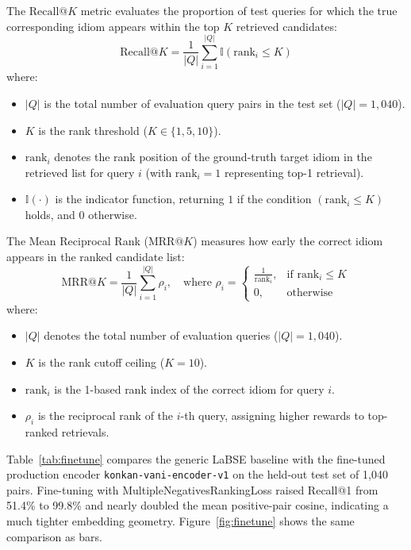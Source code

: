 \documentclass[12pt,a4paper]{article}
\begin{document}
The $\mathrm{Recall@}K$ metric evaluates the proportion of test queries for which the true corresponding idiom appears within the top $K$ retrieved candidates:
\begin{equation}
\label{eq:recall_at_k}
\mathrm{Recall@}K = \frac{1}{|Q|} \sum_{i=1}^{|Q|} \mathbb{I}(\mathrm{rank}_i \le K)
\end{equation}
where:
\begin{itemize}
  \item $|Q|$ is the total number of evaluation query pairs in the test set ($|Q| = 1{,}040$).
  \item $K$ is the rank threshold ($K \in \{1, 5, 10\}$).
  \item $\mathrm{rank}_i$ denotes the rank position of the ground-truth target idiom in the retrieved list for query $i$ (with $\mathrm{rank}_i = 1$ representing top-1 retrieval).
  \item $\mathbb{I}(\cdot)$ is the indicator function, returning $1$ if the condition $(\mathrm{rank}_i \le K)$ holds, and $0$ otherwise.
\end{itemize}

The Mean Reciprocal Rank ($\mathrm{MRR@}K$) measures how early the correct idiom appears in the ranked candidate list:
\begin{equation}
\label{eq:mrr_at_k}
\mathrm{MRR@}K = \frac{1}{|Q|} \sum_{i=1}^{|Q|} \rho_i, \quad \text{where } \rho_i = \begin{cases}
\frac{1}{\mathrm{rank}_i}, & \text{if } \mathrm{rank}_i \le K \\
0, & \text{otherwise}
\end{cases}
\end{equation}
where:
\begin{itemize}
  \item $|Q|$ denotes the total number of evaluation queries ($|Q| = 1{,}040$).
  \item $K$ is the rank cutoff ceiling ($K = 10$).
  \item $\mathrm{rank}_i$ is the 1-based rank index of the correct idiom for query $i$.
  \item $\rho_i$ is the reciprocal rank of the $i$-th query, assigning higher rewards to top-ranked retrievals.
\end{itemize}

Table~\ref{tab:finetune} compares the generic LaBSE baseline with the fine-tuned production encoder \texttt{konkan-vani-encoder-v1} on the held-out test set of 1,040 pairs. Fine-tuning with MultipleNegativesRankingLoss raised Recall@1 from 51.4\% to 99.8\% and nearly doubled the mean positive-pair cosine, indicating a much tighter embedding geometry. Figure~\ref{fig:finetune} shows the same comparison as bars.
\end{document}
